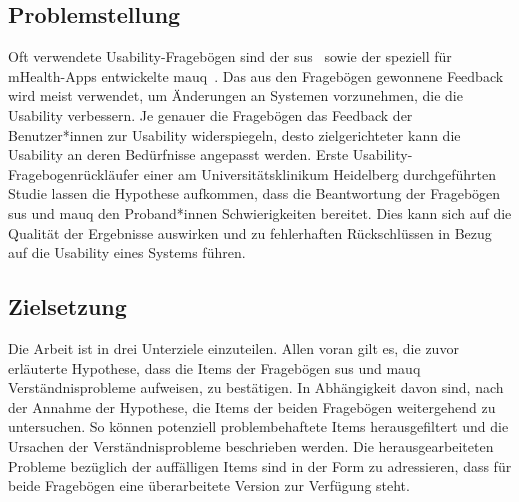 \documentclass[10pt, a4paper,onecolumn ,titlepage]{article}
\begin{document}
    \subsection{Problemstellung}
    \label{subsec:problemstellung}
    Oft verwendete Usability-Fragebögen sind der \ac{sus}~\parencite{RN8} sowie der speziell für mHealth-Apps entwickelte \ac{mauq}~\parencite{RN14}.
    Das aus den Fragebögen gewonnene Feedback wird meist verwendet, um Änderungen an Systemen vorzunehmen, die die Usability verbessern.
    Je genauer die Fragebögen das Feedback der Benutzer*innen zur Usability widerspiegeln, desto zielgerichteter kann die Usability an deren Bedürfnisse angepasst werden.
    Erste Usability-Fragebogenrückläufer einer am Universitätsklinikum Heidelberg durchgeführten Studie lassen die Hypothese aufkommen, dass die Beantwortung der Fragebögen \ac{sus} und \ac{mauq} den Proband*innen Schwierigkeiten bereitet.
    Dies kann sich auf die Qualität der Ergebnisse auswirken und zu fehlerhaften Rückschlüssen in Bezug auf die Usability eines Systems führen.


    \subsection{Zielsetzung}
    \label{subsec:zielsetzung}
    Die Arbeit ist in drei Unterziele einzuteilen.
    Allen voran gilt es, die zuvor erläuterte Hypothese, dass die Items der Fragebögen \ac{sus} und \ac{mauq} Verständnisprobleme aufweisen, zu bestätigen.
    In Abhängigkeit davon sind, nach der Annahme der Hypothese, die Items der beiden Fragebögen weitergehend zu untersuchen.
    So können potenziell problembehaftete Items herausgefiltert und die Ursachen der Verständnisprobleme beschrieben werden.
    Die herausgearbeiteten Probleme bezüglich der auffälligen Items sind in der Form zu adressieren, dass für beide Fragebögen eine überarbeitete Version zur Verfügung steht.
\end{document}
